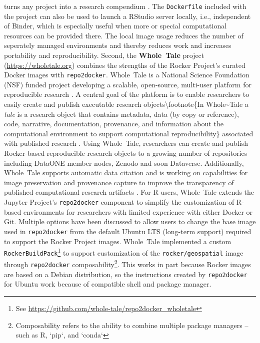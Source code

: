 turns any project into a research compendium
\citep{marwick_packaging_2018}. The \texttt{Dockerfile} included with
the project can also be used to launch a RStudio server locally, i.e.,
independent of Binder, which is especially useful when more or special
computational resources can be provided there. The local image usage
reduces the number of seperately managed environments and thereby
reduces work and increases portability and reproducibility. Second, the
\textbf{Whole~Tale} project (\url{https://wholetale.org}) combines the
strengths of the Rocker Project's curated Docker images with
\texttt{repo2docker}. Whole~Tale is a National Science Foundation (NSF)
funded project developing a scalable, open-source, multi-user platform
for reproducible research \citep{brinckman2019, chard2019a}. A central
goal of the platform is to enable researchers to easily create and
publish executable research objects\textbackslash{}footnote\{In
Whole\textasciitilde{}Tale a \emph{tale} is a research object that
contains metadata, data (by copy or reference), code, narrative,
documentation, provenance, and information about the computational
environment to support computational reproducibility\} associated with
published research \citep{chard2019b}. Using Whole~Tale, researchers can
create and publish Rocker-based reproducible research objects to a
growing number of repositories including DataONE member nodes, Zenodo
and soon Dataverse. Additionally, Whole~Tale supports automatic data
citation and is working on capabilities for image preservation and
provenance capture to improve the transparency of published
computational research artifacts \citep{mecum2018, mcphillips2019}. For
R users, Whole~Tale extends the Jupyter Project's \texttt{repo2docker}
component to simplify the customization of R-based environments for
researchers with limited experience with either Docker or Git. Multiple
options have been discussed to allow users to change the base image used
in \texttt{repo2docker} from the default Ubuntu LTS (long-term support)
required to support the Rocker Project images. Whole~Tale implemented a
custom
\texttt{RockerBuildPack}\footnote{See \href{https://github.com/whole-tale/repo2docker\_wholetale}{https://github.com/whole-tale/repo2docker\_wholetale}}
to support customization of the \texttt{rocker/geospatial} image through
\texttt{repo2docker}
composability\footnote{Composability refers to the ability to combine multiple package managers -- such as R, `pip`, and `conda`}.
This works in part because Rocker images are based on a Debian
distribution, so the instructions created by \texttt{repo2docker} for
Ubuntu work because of compatible shell and package manager.

